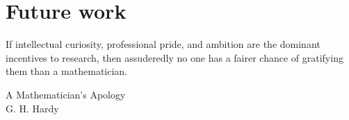 \documentclass[12pt,letterpaper]{book}
\theoremstyle{definition} \newtheorem{definition}{Definición}[section]
\theoremstyle{plain} \newtheorem{theorem}{Teorema}[section]
\theoremstyle{plain} \newtheorem{lemma}{Lema}[section]
\theoremstyle{plain} \newtheorem{proposition}[theorem]{Proposici\'on}
\theoremstyle{plain} \newtheorem{corollary}[theorem]{Corolario}
\theoremstyle{plain} \newtheorem{remark}[theorem]{Comentario}
\begin{document}
\chapter{Future work}
\epigraph{If intellectual curiosity, professional pride, and ambition are the dominant incentives to research, then assuderedly no one has a fairer chance of gratifying them than a mathematician.}{A Mathematician's Apology \\ G. H. Hardy}


\iffalse

\chapter{Some catchy name}
\epigraph{(...) it is obvious that irrationals are uninteresting to an engineer, since he is concerned only with aproximations, and all approximations are rational.}{A Mathematician's Apology \\ G. H. Hardy}


\chapter{Some catchy name}
\epigraph{I believe that mathematical reality lies outside us, that our function is to discover or \emph{observe} it, and that the theorems which we prove, and which we describe grandiloquently as our `creations', are simply our notes of our observations.}{A Mathematician's Apology \\ G. H. Hardy}

\backmatter
\appendix
\chapter{Appendix A}

\chapter{Appendix B}

\chapter{Appendix C}


\fi

\cleardoublepage
{}


\cleardoublepage
\printindex
\end{document}
